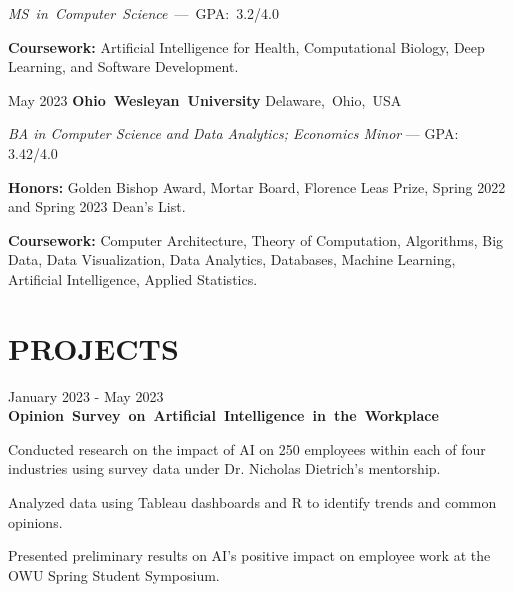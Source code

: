 \documentclass[10pt, letterpaper]{article}
\begin{document}
\vspace{\highlightSpacing}
\mbox{\textit{MS in Computer Science} --- GPA: 3.2/4.0}
\begin{onecolentry}
    \begin{highlights}
        \item \textbf{Coursework:} Artificial Intelligence for Health, Computational Biology, Deep Learning, and Software Development.
    \end{highlights}
\end{onecolentry}

\vspace{\entrySpacing}
\begin{twocolentry}{May 2023}
    \mbox{\textbf{Ohio Wesleyan University}}
    \kern {}
    \AND
    \kern {}
    \mbox{Delaware, Ohio, USA}
\end{twocolentry}

\vspace{\highlightSpacing}
{\textit{BA in Computer Science and Data Analytics; Economics Minor} --- GPA: 3.42/4.0}
\begin{onecolentry}
    \begin{highlights}
        \item \textbf{Honors:} Golden Bishop Award, Mortar Board, Florence Leas Prize, Spring 2022 and Spring 2023 Dean's List.

        \item \textbf{Coursework:} Computer Architecture, Theory of Computation, Algorithms, Big Data, Data Visualization, Data Analytics, Databases, Machine Learning, Artificial Intelligence, Applied Statistics.
    \end{highlights}
\end{onecolentry}

\section{PROJECTS}

\begin{twocolentry}{January 2023 - May 2023}
    \mbox{\textbf{Opinion Survey on Artificial Intelligence in the Workplace}}
\end{twocolentry}

\vspace{\highlightSpacing}
\begin{onecolentry}
    \begin{highlights}
        \item Conducted research on the impact of AI on 250 employees within each of four industries using survey data under Dr. Nicholas Dietrich's mentorship.
        \item Analyzed data using Tableau dashboards and R to identify trends and common opinions.
        \item Presented preliminary results on AI's positive impact on employee work at the OWU Spring Student Symposium.
    \end{highlights}
\end{onecolentry}
\end{document}
